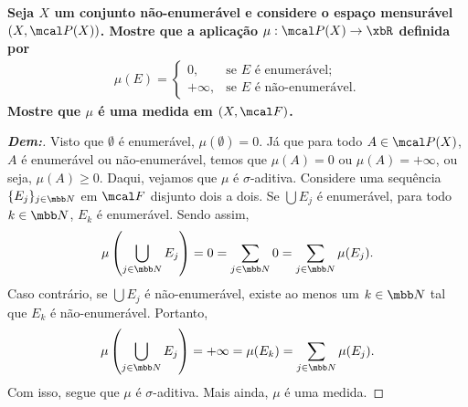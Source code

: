 \biglinend
\newpage 
{}
\bigline
\textbf{Seja $X$ um conjunto não-enumerável e considere o espaço mensurável $(X, \mcal P(X))$. 
Mostre que a aplicação $\mu: \mcal P(X) \rightarrow \xbR$ definida por 
\begin{align*}
  \mu(E) = \begin{cases}
    0, &\text{se $E$ é enumerável;}\\
    +\infty, &\text{se $E$ é não-enumerável.}
  \end{cases}
\end{align*}
Mostre que $\mu$ é uma medida em $(X, \mcal F)$.}
\begin{proof}[\textbf{Dem:}]
Visto que $\emptyset$ é enumerável, $\mu(\emptyset) = 0$. Já que para todo $A \in \mcal P(X)$, 
  $A$ é enumerável ou não-enumerável, temos que $\mu(A) = 0$ ou $\mu(A) = +\infty$, ou seja, 
  $\mu(A) \ge 0$. Daqui, vejamos que $\mu$ é $\sigma$-aditiva. Considere uma sequência 
  $\{E_j\}_{j \in \mbb N}$ em $\mcal F$ disjunto dois a dois. Se $\bigcup E_j$ é enumerável, 
  para todo $k \in \mbb N$, $E_k$ é enumerável. Sendo assim, 
  \begin{align*}
    \mu\left(\bigcup\limits_{j \in \mbb N} E_j\right) = 0 
    = \sum_{j \in \mbb N} 0 = \sum_{j \in \mbb N} \mu(E_j).
  \end{align*}
  Caso contrário, se $\bigcup E_j$ é não-enumerável, existe ao menos um $k \in \mbb N$ 
  tal que $E_k$ é não-enumerável. Portanto, 
  \begin{align*}
    \mu\left(\bigcup_{j \in \mbb N} E_j\right) = +\infty = \mu(E_k)
    = \sum_{j \in \mbb N} \mu(E_j).
  \end{align*}
  Com isso, segue que $\mu$ é $\sigma$-aditiva. Mais ainda, $\mu$ é uma medida.
\end{proof}


